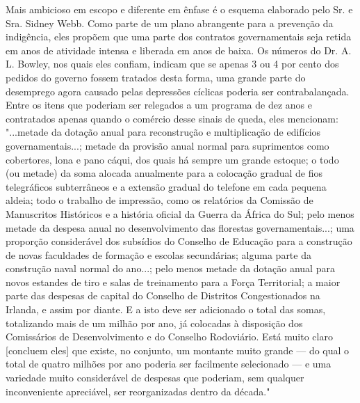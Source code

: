 \documentclass[12pt]{article}
\begin{document}
Mais ambicioso em escopo e diferente em ênfase é o esquema elaborado pelo Sr. e Sra. Sidney Webb. Como parte de um plano abrangente para a prevenção da indigência, eles propõem que uma parte dos contratos governamentais seja retida em anos de atividade intensa e liberada em anos de baixa. Os números do Dr. A. L. Bowley, nos quais eles confiam, indicam que se apenas 3 ou 4 por cento dos pedidos do governo fossem tratados desta forma, uma grande parte do desemprego agora causado pelas depressões cíclicas poderia ser contrabalançada. Entre os itens que poderiam ser relegados a um programa de dez anos e contratados apenas quando o comércio desse sinais de queda, eles mencionam: "...metade da dotação anual para reconstrução e multiplicação de edifícios governamentais...; metade da provisão anual normal para suprimentos como cobertores, lona e pano cáqui, dos quais há sempre um grande estoque; o todo (ou metade) da soma alocada anualmente para a colocação gradual de fios telegráficos subterrâneos e a extensão gradual do telefone em cada pequena aldeia; todo o trabalho de impressão, como os relatórios da Comissão de Manuscritos Históricos e a história oficial da Guerra da África do Sul; pelo menos metade da despesa anual no desenvolvimento das florestas governamentais...; uma proporção considerável dos subsídios do Conselho de Educação para a construção de novas faculdades de formação e escolas secundárias; alguma parte da construção naval normal do ano...; pelo menos metade da dotação anual para novos estandes de tiro e salas de treinamento para a Força Territorial; a maior parte das despesas de capital do Conselho de Distritos Congestionados na Irlanda, e assim por diante. E a isto deve ser adicionado o total das somas, totalizando mais de um milhão por ano, já colocadas à disposição dos Comissários de Desenvolvimento e do Conselho Rodoviário. Está muito claro [concluem eles] que existe, no conjunto, um montante muito grande — do qual o total de quatro milhões por ano poderia ser facilmente selecionado — e uma variedade muito considerável de despesas que poderiam, sem qualquer inconveniente apreciável, ser reorganizadas dentro da década."
\end{document}
